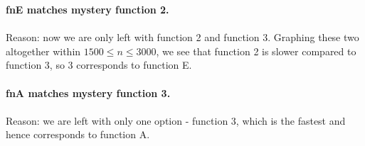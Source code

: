 \documentclass{article}
\begin{document}
\begin{itemize}
            \textbf{fnE matches mystery function 2.} \\ \\
            Reason: now we are only left with function 2 and function 3. Graphing these two altogether within $1500 \leq n \leq 3000$, we see that function 2 is slower
            compared to function 3, so 3 corresponds to function E. \\ \\
            
            \textbf{fnA matches mystery function 3.} \\ \\
            Reason: we are left with only one option - function 3, which is the fastest and hence corresponds to function A.         
    \end{itemize}
\end{document}
